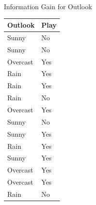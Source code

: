 \documentclass{beamer}
\begin{document}
\begin{frame}{Information Gain for Outlook}
\begin{tabular}{l|l} \toprule
\textbf{Outlook} & \textbf{Play} \\ \midrule
Sunny    & No   \\
Sunny    & No   \\
Overcast & Yes  \\
Rain     & Yes  \\
Rain     & Yes  \\
Rain     & No   \\
Overcast & Yes  \\
Sunny    & No   \\
Sunny    & Yes  \\
Rain     & Yes  \\
Sunny    & Yes  \\
Overcast & Yes  \\
Overcast & Yes  \\
Rain     & No  \\ \bottomrule
\end{tabular}
\end{frame}
\end{document}
